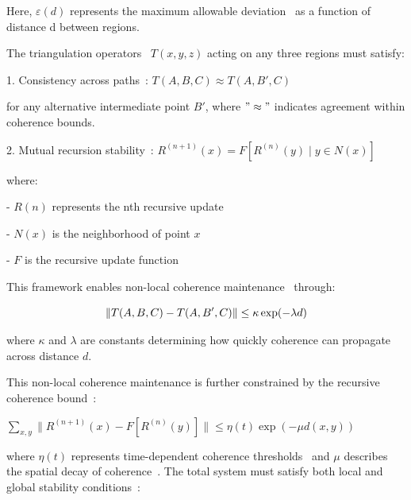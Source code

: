 Here, $\varepsilon(d)$ represents the maximum allowable deviation~ as a function of distance d between regions.

The triangulation operators~ $T(x,y,z)$ acting on any three regions must satisfy:

1. Consistency across paths~:
$T(A,B,C) \approx T(A,B',C)$

for any alternative intermediate point $B'$, where $"\approx"$ indicates agreement within coherence bounds.

2. Mutual recursion stability~:
$R^{(n+1)}(x) = F[R^{(n)}(y) \mid y \in N(x)]$

where:

- $R(n)$ represents the nth recursive update~

- $N(x)$ is the neighborhood of point $x$

- $F$ is the recursive update function~

This framework enables non-local coherence maintenance~ through:

\begin{equation}
    \|T(A,B,C) - T(A,B',C)\| \leq \kappa \exp(-\lambda d)
    \myequation{Non-local coherence maintenance through triangulation}
    \label{eq:triangulation_coherence}
\end{equation}

where $\kappa$ and $\lambda$ are constants determining how quickly coherence can propagate across distance $d$.

This non-local coherence maintenance is further constrained by the recursive coherence bound~:

$\sum_{x,y} \|R^{(n+1)}(x) - F[R^{(n)}(y)]\| \leq \eta(t)\exp(-\mu d(x,y))$

where $\eta(t)$ represents time-dependent coherence thresholds~ and $\mu$ describes the spatial decay of coherence~. The total system must satisfy both local and global stability conditions~:

